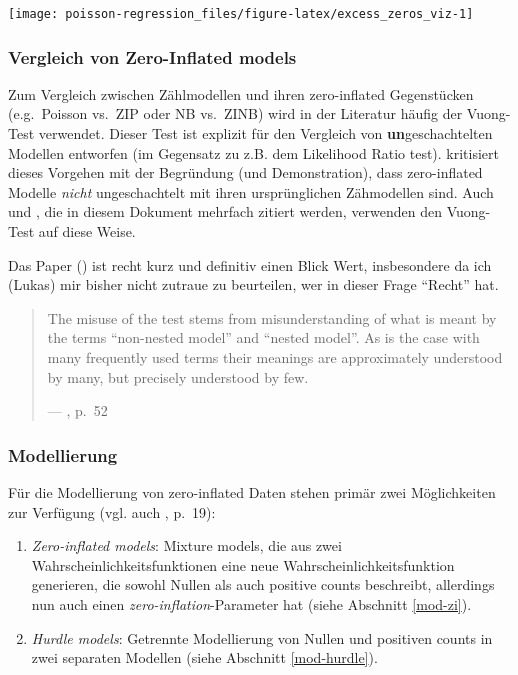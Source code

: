 \documentclass[ngerman,a4paper,]{scrartcl}
\providecommand{\tightlist}{%
  \setlength{\itemsep}{0pt}\setlength{\parskip}{0pt}}
\theoremstyle{definition}
\theoremstyle{definition}
\theoremstyle{definition}
\theoremstyle{remark}
\begin{document}
\begin{center}\texttt{[image: poisson-regression\_files/figure-latex/excess\_zeros\_viz-1]} \end{center}

\hypertarget{zi-compare}{%
\subsubsection{Vergleich von Zero-Inflated models}\label{zi-compare}}

Zum Vergleich zwischen Zählmodellen und ihren zero-inflated Gegenstücken (e.g.~Poisson vs.~ZIP oder NB vs.~ZINB) wird in der Literatur häufig der Vuong-Test \citep{vuongLikelihoodRatioTests1989, desmarais2013TestingZero} verwendet. Dieser Test ist explizit für den Vergleich von \textbf{un}geschachtelten Modellen entworfen (im Gegensatz zu z.B. dem Likelihood Ratio test). \citet{wilson2015MisuseVuong} kritisiert dieses Vorgehen mit der Begründung (und Demonstration), dass zero-inflated Modelle \emph{nicht} ungeschachtelt mit ihren ursprünglichen Zähmodellen sind. Auch \citet{perumean-chaneyZeroinflatedOverdispersedWhat2013} und \citet{hilbeModelingCountData2014}, die in diesem Dokument mehrfach zitiert werden, verwenden den Vuong-Test auf diese Weise.

Das Paper (\citet{wilson2015MisuseVuong}) ist recht kurz und definitiv einen Blick Wert, insbesondere da ich (Lukas) mir bisher nicht zutraue zu beurteilen, wer in dieser Frage \enquote{Recht} hat.

\begin{quote}
The misuse of the test stems from misunderstanding of what is meant by the terms \enquote{non-nested model} and \enquote{nested model}. As is the case with many frequently used terms their meanings are approximately understood by many, but precisely understood by few.

--- \citet{wilson2015MisuseVuong}, p.~52
\end{quote}

\hypertarget{zi-modelling}{%
\subsubsection{Modellierung}\label{zi-modelling}}

Für die Modellierung von zero-inflated Daten stehen primär zwei Möglichkeiten zur Verfügung (vgl. auch \citet{hilbeModelingCountData2014}, p.~19):

\begin{enumerate}
\def\labelenumi{\arabic{enumi}.}
\tightlist
\item
  \emph{Zero-inflated models}: Mixture models, die aus zwei Wahrscheinlichkeitsfunktionen eine neue Wahrscheinlichkeitsfunktion generieren, die sowohl Nullen als auch positive counts beschreibt, allerdings nun auch einen \emph{zero-inflation}-Parameter hat (siehe Abschnitt \ref{mod-zi}).
\item
  \emph{Hurdle models}: Getrennte Modellierung von Nullen und positiven counts in zwei separaten Modellen (siehe Abschnitt \ref{mod-hurdle}).
\end{enumerate}
\end{document}

